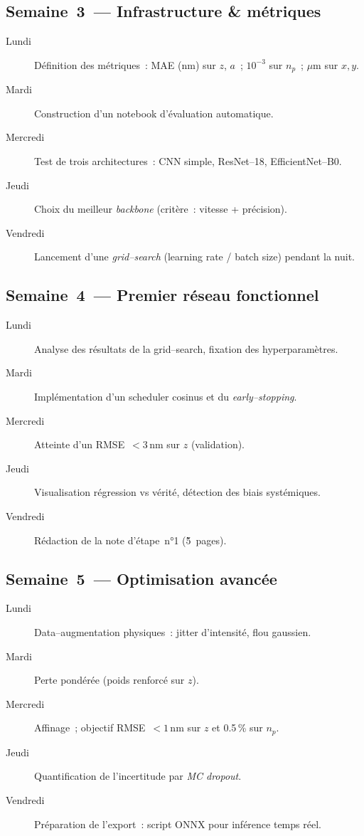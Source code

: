 \documentclass[11pt,a4paper]{article}
\begin{document}
\subsection*{Semaine 3 — Infrastructure \& métriques}
\begin{description}
  \item[Lundi] Définition des métriques : MAE (nm) sur $z$, $a$ ; $10^{-3}$ sur $n_p$ ; $\mu$m sur $x,y$.
  \item[Mardi] Construction d'un notebook d'évaluation automatique.
  \item[Mercredi] Test de trois architectures : CNN simple, ResNet--18, EfficientNet--B0.
  \item[Jeudi] Choix du meilleur \emph{backbone} (critère : vitesse + précision).
  \item[Vendredi] Lancement d'une \emph{grid--search} (learning rate / batch size) pendant la nuit.
\end{description}

\subsection*{Semaine 4 — Premier réseau fonctionnel}
\begin{description}
  \item[Lundi] Analyse des résultats de la grid--search, fixation des hyperparamètres.
  \item[Mardi] Implémentation d'un scheduler cosinus et du \emph{early--stopping}.
  \item[Mercredi] Atteinte d'un RMSE~$<3\,$nm sur $z$ (validation).
  \item[Jeudi] Visualisation régression vs vérité, détection des biais systémiques.
  \item[Vendredi] Rédaction de la note d'étape n°1 (\~5 pages).
\end{description}

\subsection*{Semaine 5 — Optimisation avancée}
\begin{description}
  \item[Lundi] Data--augmentation physiques : jitter d'intensité, flou gaussien.
  \item[Mardi] Perte pondérée (poids renforcé sur $z$).
  \item[Mercredi] Affinage ; objectif RMSE~$<1\,$nm sur $z$ et 0.5\,\% sur $n_p$.
  \item[Jeudi] Quantification de l'incertitude par \emph{MC dropout}.
  \item[Vendredi] Préparation de l'export : script ONNX pour inférence temps réel.
\end{description}
\end{document}
